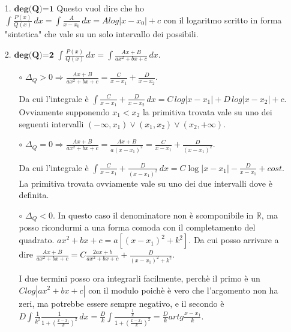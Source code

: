 \documentclass{article}
\theoremstyle{definition}
\theoremstyle{definition}
\theoremstyle{definition}
\theoremstyle{definition}
\theoremstyle{definition}
\begin{document}
\begin{itemize}
    \item [1.] $\textbf{deg(Q)=1}$
                \newline
                Questo vuol dire che ho $\displaystyle{\int\frac{P(x)}{Q(x)}\,dx=\int\frac{A}{x-x_0}\,dx=Alog\left|x-x_0\right|+c}$ con il logaritmo scritto in forma "sintetica" che vale su un solo intervallo dei possibili.
    \item [2.] $\textbf{deg(Q)=2}$
                \newline
                \newline
                $\displaystyle{\int\frac{P(x)}{Q(x)}\,dx=\int\frac{Ax+B}{ax^2+bx+c}\,dx}$.
                \begin{itemize}
                    \item [$\circ$] $\displaystyle{\Delta_Q>0 \Rightarrow \frac{Ax+B}{ax^2+bx+c}=\frac{C}{x-x_1}+\frac{D}{x-x_2}}$. 
                    
                    Da cui l'integrale è $\displaystyle{\int\frac{C}{x-x_1}+\frac{D}{x-x_2}\,dx=C\,log\left|x-x_1\right|+D\,log\left|x-x_2\right|+c}$.
                    Ovviamente supponendo $x_1<x_2$ la primitiva trovata vale su uno dei seguenti intervalli $(-\infty,x_1)\vee(x_1,x_2)\vee(x_2,+\infty)$.

                    \item [$\circ$] $\displaystyle{\Delta_Q=0} \Rightarrow \frac{Ax+B}{ax^2+bx+c}=\frac{Ax+B}{a(x-x_1)^2}=\frac{C}{x-x_1}+\frac{D}{(x-x_1)^2}$.
                    
                    Da cui l'integrale è $\displaystyle{\int\frac{C}{x-x_1}+\frac{D}{(x-x_1)^2}\,dx}=C\log\left|x-x_1\right|-\frac{D}{x-x_1} +cost$.
                    La primitiva trovata ovviamente vale su uno dei due intervalli dove è definita.

                    \item [$\circ$] $\displaystyle{\Delta_Q<0}$. In questo caso il denominatore non è scomponibile in $\mathbb{R}$, ma posso ricondurmi a una forma comoda con il completamento del quadrato. 
                    $\displaystyle{ax^2+bx+c=a[(x-x_1)^2+k^2]}$. Da cui posso arrivare a dire $\displaystyle{\frac{Ax+B}{ax^2+bx+c}=C\frac{2ax+b}{ax^2+bx+c}+\frac{D}{(x-x_1)^2+k^2}}$.

                    I due termini posso ora integrarli facilmente, perchè il primo è un $Clog\left|ax^2+bx+c\right|$ con il modulo poichè è vero che l'argomento non ha zeri, ma potrebbe essere sempre negativo, e il secondo è $\displaystyle{D\int\frac{1}{k^2}\frac{1}{1+(\frac{x-x_1}{k})^2}\,dx=\frac{D}{k}\int\frac{\frac{1}{k}}{1+(\frac{x-x_1}{k})^2}=\frac{D}{k}artg\frac{x-x_1}{k}}$.


\end{itemize}
\end{itemize}
\end{document}
